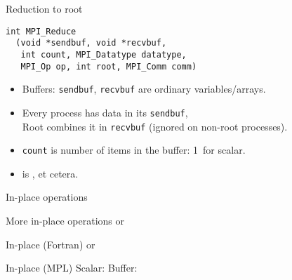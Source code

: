 \begin{numberedframe}{Reduction to root}
\lstset{language=C}
\begin{lstlisting}
int MPI_Reduce
  (void *sendbuf, void *recvbuf,
   int count, MPI_Datatype datatype, 
   MPI_Op op, int root, MPI_Comm comm)
\end{lstlisting}
\begin{itemize}
\item Buffers: \lstinline{sendbuf}, \lstinline{recvbuf} are ordinary variables/arrays.
\item Every process has data in its \lstinline{sendbuf},\\
  Root combines it in \lstinline{recvbuf} (ignored on non-root processes).
\item \lstinline{count} is number of items in the buffer: 1~for scalar.
\item {} is ,  et cetera.
\end{itemize}
\end{numberedframe}

\begin{numberedframe}{In-place operations}
\end{numberedframe}

\begin{numberedframe}{More in-place operations}
  or
\end{numberedframe}

\begin{fortran}
  \addtocounter{slidecount}{-1}
  \scriptsize
\begin{numberedframe}{In-place (Fortran)}
  or
\end{numberedframe}
\end{fortran}

\begin{mpl}
  \addtocounter{slidecount}{-1}
\begin{numberedframe}{In-place (MPL)}
  Scalar:
  Buffer:
\end{numberedframe}
\end{mpl}

